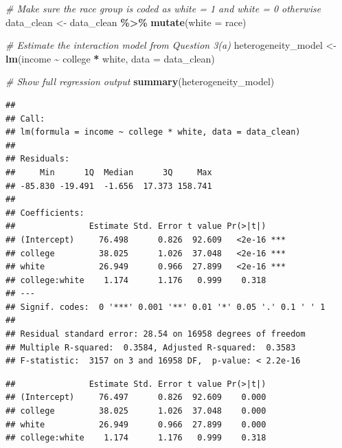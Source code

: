 \documentclass[
]{article}
\newenvironment{Shaded}{\begin{snugshade}}{\end{snugshade}}
\newcommand{\AttributeTok}[1]{\textcolor[rgb]{0.13,0.29,0.53}{#1}}
\newcommand{\CommentTok}[1]{\textcolor[rgb]{0.56,0.35,0.01}{\textit{#1}}}
\newcommand{\DecValTok}[1]{\textcolor[rgb]{0.00,0.00,0.81}{#1}}
\newcommand{\FunctionTok}[1]{\textcolor[rgb]{0.13,0.29,0.53}{\textbf{#1}}}
\newcommand{\NormalTok}[1]{#1}
\newcommand{\OtherTok}[1]{\textcolor[rgb]{0.56,0.35,0.01}{#1}}
\newcommand{\SpecialCharTok}[1]{\textcolor[rgb]{0.81,0.36,0.00}{\textbf{#1}}}
\begin{document}
\begin{Shaded}
\begin{Highlighting}[]
\CommentTok{\# Make sure the race group is coded as white = 1 and white = 0 otherwise}
\NormalTok{data\_clean }\OtherTok{\textless{}{-}}\NormalTok{ data\_clean }\SpecialCharTok{\%\textgreater{}\%}
  \FunctionTok{mutate}\NormalTok{(}\AttributeTok{white =}\NormalTok{ race)}

\CommentTok{\# Estimate the interaction model from Question 3(a)}
\NormalTok{heterogeneity\_model }\OtherTok{\textless{}{-}} \FunctionTok{lm}\NormalTok{(income }\SpecialCharTok{\textasciitilde{}}\NormalTok{ college }\SpecialCharTok{*}\NormalTok{ white, }\AttributeTok{data =}\NormalTok{ data\_clean)}

\CommentTok{\# Show full regression output}
\FunctionTok{summary}\NormalTok{(heterogeneity\_model)}
\end{Highlighting}
\end{Shaded}

\begin{verbatim}
## 
## Call:
## lm(formula = income ~ college * white, data = data_clean)
## 
## Residuals:
##     Min      1Q  Median      3Q     Max 
## -85.830 -19.491  -1.656  17.373 158.741 
## 
## Coefficients:
##               Estimate Std. Error t value Pr(>|t|)    
## (Intercept)     76.498      0.826  92.609   <2e-16 ***
## college         38.025      1.026  37.048   <2e-16 ***
## white           26.949      0.966  27.899   <2e-16 ***
## college:white    1.174      1.176   0.999    0.318    
## ---
## Signif. codes:  0 '***' 0.001 '**' 0.01 '*' 0.05 '.' 0.1 ' ' 1
## 
## Residual standard error: 28.54 on 16958 degrees of freedom
## Multiple R-squared:  0.3584, Adjusted R-squared:  0.3583 
## F-statistic:  3157 on 3 and 16958 DF,  p-value: < 2.2e-16
\end{verbatim}

\begin{Shaded}
\end{Shaded}

\begin{verbatim}
##               Estimate Std. Error t value Pr(>|t|)
## (Intercept)     76.497      0.826  92.609    0.000
## college         38.025      1.026  37.048    0.000
## white           26.949      0.966  27.899    0.000
## college:white    1.174      1.176   0.999    0.318
\end{verbatim}
\end{document}
